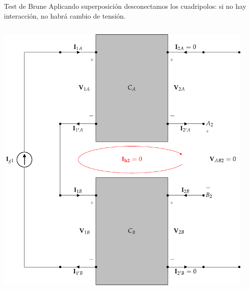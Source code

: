 \documentclass[aspectratio=169, usenames,svgnames,dvipsnames]{beamer}
\begin{document}
\begin{frame}[label={sec:orgb969a12},plain]{Test de Brune}
Aplicando superposición desconectamos los cuadripolos: \alert{si no hay interacción, no habrá cambio de tensión}.
\begin{columns}
\begin{column}{0.5\columnwidth}
\begin{center}
\includegraphics[height=0.8\textheight]{../figs/serie-serie-brune-entrada.pdf}
\end{center}
\end{column}
\begin{column}{0.5\columnwidth}
\begin{center}

\end{center}
\end{column}
\end{columns}
\end{frame}
\end{document}
